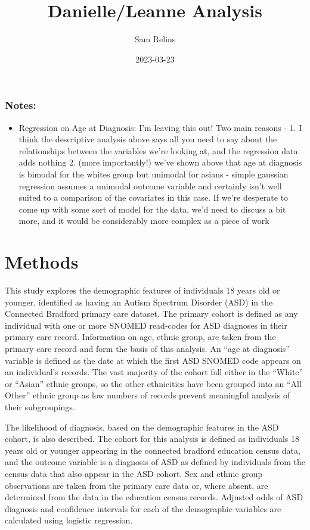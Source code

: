 \documentclass[
]{article}
\title{Danielle/Leanne Analysis}
\author{Sam Relins}
\date{2023-03-23}
\providecommand{\tightlist}{%
  \setlength{\itemsep}{0pt}\setlength{\parskip}{0pt}}
\begin{document}
\maketitle

\hypertarget{notes}{%
\subsubsection{Notes:}\label{notes}}

\begin{itemize}
\tightlist
\item
  Regression on Age at Diagnosis: I'm leaving this out! Two main reasons
  - 1. I think the descriptive analysis above says all you need to say
  about the relationships between the variables we're looking at, and
  the regression data adds nothing 2. (more importantly!) we've shown
  above that age at diagnosis is bimodal for the whites group but
  unimodal for asians - simple gaussian regression assumes a unimodal
  outcome variable and certainly isn't well suited to a comparison of
  the covariates in this case. If we're desperate to come up with some
  sort of model for the data, we'd need to discuss a bit more, and it
  would be considerably more complex as a piece of work
\end{itemize}

\hypertarget{methods}{%
\section{Methods}\label{methods}}

This study explores the demographic features of individuals 18 years old
or younger, identified as having an Autism Spectrum Disorder (ASD) in
the Connected Bradford primary care dataset. The primary cohort is
defined as any individual with one or more SNOMED read-codes for ASD
diagnoses in their primary care record. Information on age, ethnic
group, are taken from the primary care record and form the basis of this
analysis. An ``age at diagnosis'' variable is defined as the date at
which the first ASD SNOMED code appears on an individual's records. The
vast majority of the cohort fall either in the ``White'' or ``Asian''
ethnic groups, so the other ethnicities have been grouped into an ``All
Other'' ethnic group as low numbers of records prevent meaningful
analysis of their subgroupings.

The likelihood of diagnosis, based on the demographic features in the
ASD cohort, is also described. The cohort for this analysis is defined
as individuals 18 years old or younger appearing in the connected
bradford education census data, and the outcome variable is a diagnosis
of ASD as defined by individuals from the census data that also appear
in the ASD cohort. Sex and ethnic group observations are taken from the
primary care data or, where absent, are determined from the data in the
education census records. Adjusted odds of ASD diagnosis and confidence
intervals for each of the demographic variables are calculated using
logistic regression.
\end{document}
